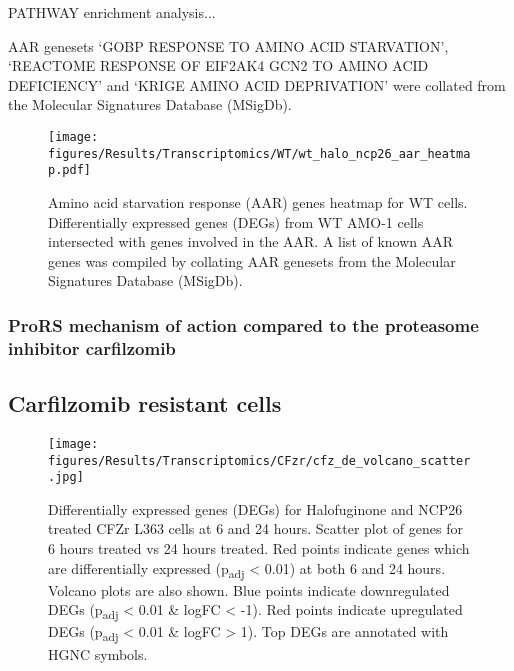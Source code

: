PATHWAY enrichment analysis...

AAR genesets `GOBP RESPONSE TO AMINO ACID STARVATION', `REACTOME RESPONSE OF EIF2AK4 GCN2 TO AMINO ACID DEFICIENCY' and `KRIGE AMINO ACID DEPRIVATION' were collated from the Molecular Signatures Database (MSigDb).


\begin{figure}[p]
\centering
\texttt{[image: figures/Results/Transcriptomics/WT/wt\_halo\_ncp26\_aar\_heatmap.pdf]}
\caption[Amino acid starvation response genes heatmap WT cells]{Amino acid starvation response (AAR) genes heatmap for WT cells.
Differentially expressed genes (DEGs) from WT AMO-1 cells intersected with genes involved in the AAR.
A list of known AAR genes was compiled by collating AAR genesets from the Molecular Signatures Database (MSigDb).
}
\label{fig:wt_de}
\end{figure}


\subsubsection{ProRS mechanism of action compared to the proteasome inhibitor carfilzomib}



\subsection{Carfilzomib resistant cells}


\begin{figure}[htb]
\centering
\texttt{[image: figures/Results/Transcriptomics/CFzr/cfz\_de\_volcano\_scatter.jpg]}
\caption[Differentially expressed genes CFZr L363 cells]{Differentially expressed genes (DEGs) for Halofuginone and NCP26 treated CFZr L363 cells at 6 and 24 hours.
Scatter plot of genes for 6 hours treated vs 24 hours treated.
Red points indicate genes which are differentially expressed (p\textsubscript{adj} < 0.01) at both 6 and 24 hours.
Volcano plots are also shown.
Blue points indicate downregulated DEGs (p\textsubscript{adj} < 0.01 \& logFC < -1).
Red points indicate upregulated DEGs (p\textsubscript{adj} < 0.01 \& logFC > 1).
Top DEGs are annotated with HGNC symbols.
}
\label{fig:cfz_de}
\end{figure}



